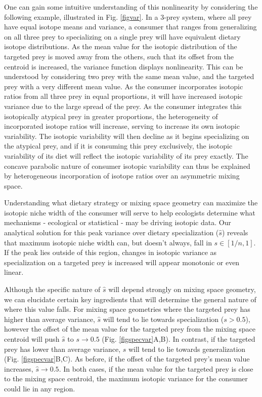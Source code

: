 \documentclass{frontiersSCNS}
\begin{document}
One can gain some intuitive understanding of this nonlinearity by considering the following example, illustrated in Fig. \ref{figvar}.
In a 3-prey system, where all prey have equal isotope means and variance, a consumer that ranges from generalizing on all three prey to specializing on a single prey will have equivalent dietary isotope distributions.
As the mean value for the isotopic distribution of the targeted prey is moved away from the others, such that its offset from the centroid is increased, the variance function displays nonlinearity.
This can be understood by considering two prey with the same mean value, and the targeted prey with a very different mean value.
As the consumer incorporates isotopic ratios from all three prey in equal proportions, it will have increased isotopic variance due to the large spread of the prey.
As the consumer integrates this isotopically atypical prey in greater proportions, the heterogeneity of incorporated isotope ratios will increase, serving to increase its own isotopic variability.
The isotopic variability will then decline as it begins specializing on the atypical prey, and if it is consuming this prey exclusively, the isotopic variability of its diet will reflect the isotopic variability of its prey exactly.
The concave parabolic nature of consumer isotopic variability can thus be explained by heterogeneous incorporation of isotope ratios over an asymmetric mixing space.



Understanding what dietary strategy or mixing space geometry can maximize the isotopic niche width of the consumer will serve to help ecologists determine what mechanisms - ecological or statistical - may be driving isotopic data.
Our analytical solution for this peak variance over dietary specialization ($\hat s$) reveals that maximum isotopic niche width can, but doesn't always, fall in $s \in [1/n,1]$.
If the peak lies outside of this region, changes in isotopic variance as specialization on a targeted prey is increased will appear monotonic or even linear.

Although the specific nature of $\hat s$ will depend strongly on mixing space geometry, we can elucidate certain key ingredients that will determine the general nature of where this value falls.
For mixing space geometries where the targeted prey has higher than average variance, $\hat s$ will tend to lie towards specialization ($s>0.5$), however the offset of the mean value for the targeted prey from the mixing space centroid will push $\hat s$ to $s \to 0.5$ (Fig. \ref{figspecvar}A,B).
In contrast, if the targeted prey has lower than average variance, $\hat s$ will tend to lie towards generalization (Fig. \ref{figspecvar}B,C).
As before, if the offset of the targeted prey's mean value increases, $\hat s \to 0.5$.
In both cases, if the mean value for the targeted prey is close to the mixing space centroid, the maximum isotopic variance for the consumer could lie in any region.
\end{document}
